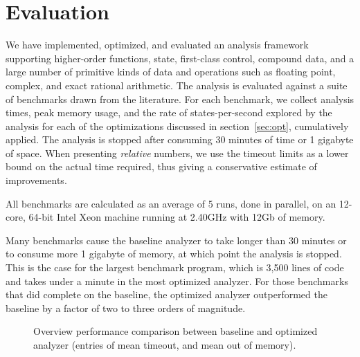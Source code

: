 \documentclass[preprint,onecolumn,9pt]{sigplanconf} %
\begin{document}
\section{Evaluation}
\label{sec:eval}

We have implemented, optimized, and evaluated an analysis framework
supporting higher-order functions, state, first-class control,
compound data, and a large number of primitive kinds of data and
operations such as floating point, complex, and exact rational
arithmetic.  The analysis is evaluated against a suite of benchmarks
drawn from the literature.
%
For each benchmark, we collect analysis times, peak memory usage, and
the rate of states-per-second explored by the analysis for each of the
optimizations discussed in section~\ref{sec:opt}, cumulatively
applied.  The analysis is stopped after consuming 30 minutes of time
or 1 gigabyte of space.  When presenting \emph{relative} numbers, we
use the timeout limits as a lower bound on the actual time required,
thus giving a conservative estimate of improvements.

All benchmarks are calculated as an average of 5 runs, done in
parallel, on an 12-core, 64-bit Intel Xeon machine running at 2.40GHz
with 12Gb of memory.

Many benchmarks cause the baseline analyzer to take longer than 30
minutes or to consume more 1 gigabyte of memory, at which point the
analysis is stopped.  This is the case for the largest benchmark
program, which is 3,500 lines of code and takes under a minute in the
most optimized analyzer.  For those benchmarks that did complete on
the baseline, the optimized analyzer outperformed the baseline by a
factor of two to three orders of magnitude.

\begin{figure}
\centering

\caption{Overview performance comparison between baseline and
  optimized analyzer (entries of  mean timeout, and  mean out of memory).}
\label{fig:bench-overview}
\end{figure}
\end{document}
